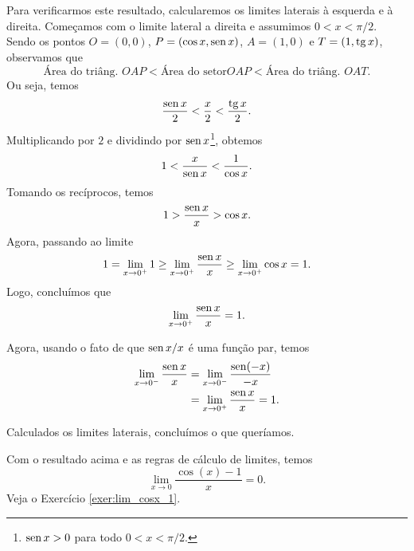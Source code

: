 Para verificarmos este resultado, calcularemos os limites laterais à esquerda e à direita. Começamos com o limite lateral a direita e assumimos $0<x<\pi/2$. Sendo os pontos $O=(0,0)$, $P=(\cos x,\operatorname{sen} x)$, $A = (1,0)$ e $T = (1, \operatorname{tg} x)$, observamos que
\begin{equation}
  \text{Área do triâng. } OAP < \text{Área do setor} OAP < \text{Área do triâng. } OAT.
\end{equation}
Ou seja, temos
\begin{equation}
  \frac{\operatorname{sen} x}{2} < \frac{x}{2} < \frac{\operatorname{tg} x}{2}.
\end{equation}
Multiplicando por $2$ e dividindo por $\operatorname{sen} x$\footnote{$\operatorname{sen} x > 0$ para todo $0< x < \pi/2$.}, obtemos
\begin{equation}
  1 < \frac{x}{\operatorname{sen} x} < \frac{1}{\cos x}.
\end{equation}
Tomando os recíprocos, temos
\begin{equation}
  1 > \frac{\operatorname{sen} x}{x} > \cos x.
\end{equation}
Agora, passando ao limite
\begin{equation}
  1 = \lim_{x\to 0^+} 1 \geq \lim_{x\to 0^+} \frac{\operatorname{sen} x}{x} \geq \lim_{x\to 0^+} \cos x = 1.
\end{equation}
Logo, concluímos que
\begin{equation}
  \lim_{x\to 0^+} \frac{\operatorname{sen} x}{x} = 1.
\end{equation}

Agora, usando o fato de que $\operatorname{sen} x/x$ é uma função par, temos
\begin{align}
  \lim_{x\to 0^-} \frac{\operatorname{sen} x}{x} &= \lim_{x\to 0^-} \frac{\operatorname{sen}(-x)}{-x} \\
  &= \lim_{x\to 0^+} \frac{\operatorname{sen} x}{x} = 1.
\end{align}

Calculados os limites laterais, concluímos o que queríamos.

\begin{ex}
  Com o resultado acima e as regras de cálculo de limites, temos
  \begin{equation}
    \lim_{x\to 0} \frac{\cos(x) - 1}{x} = 0.
  \end{equation}
  Veja o Exercício \ref{exer:lim_cosx_1}.
\end{ex}


